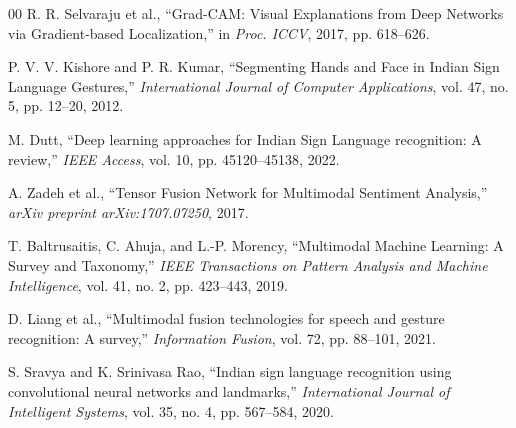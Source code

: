 \documentclass[conference]{IEEEtran}
\begin{document}
\begin{thebibliography}{00}
R. R. Selvaraju et al., ``Grad-CAM: Visual Explanations from Deep Networks via Gradient-based Localization,'' in \textit{Proc. ICCV}, 2017, pp. 618--626.

P. V. V. Kishore and P. R. Kumar, ``Segmenting Hands and Face in Indian Sign Language Gestures,'' \textit{International Journal of Computer Applications}, vol. 47, no. 5, pp. 12--20, 2012.

M. Dutt, ``Deep learning approaches for Indian Sign Language recognition: A review,'' \textit{IEEE Access}, vol. 10, pp. 45120--45138, 2022.

A. Zadeh et al., ``Tensor Fusion Network for Multimodal Sentiment Analysis,'' \textit{arXiv preprint arXiv:1707.07250}, 2017.

T. Baltrusaitis, C. Ahuja, and L.-P. Morency, ``Multimodal Machine Learning: A Survey and Taxonomy,'' \textit{IEEE Transactions on Pattern Analysis and Machine Intelligence}, vol. 41, no. 2, pp. 423--443, 2019.

D. Liang et al., ``Multimodal fusion technologies for speech and gesture recognition: A survey,'' \textit{Information Fusion}, vol. 72, pp. 88--101, 2021.

S. Sravya and K. Srinivasa Rao, ``Indian sign language recognition using convolutional neural networks and landmarks,'' \textit{International Journal of Intelligent Systems}, vol. 35, no. 4, pp. 567--584, 2020.

\end{thebibliography}
\end{document}
